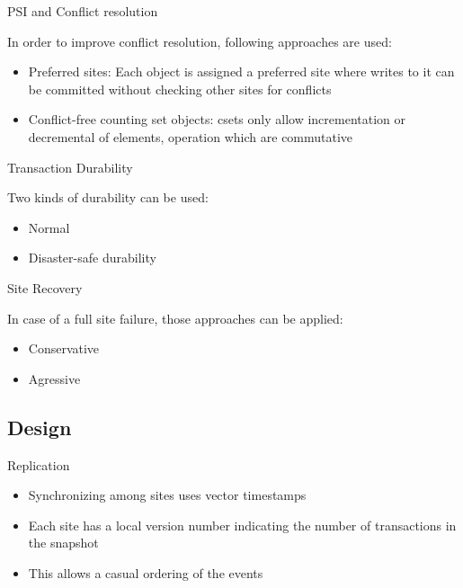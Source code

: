 \documentclass{beamer}
\begin{document}
		\begin{frame}{PSI and Conflict resolution}
		
		In order to improve conflict resolution, following approaches are used:
		
		\begin{itemize}
		
		\item Preferred sites: Each object is assigned a preferred site where writes to it can be committed without checking other sites for conflicts
		\item Conflict-free counting set objects: csets only allow incrementation or decremental of elements, operation which are commutative  
		
		\end{itemize}
		
		\end{frame}
		
		\begin{frame}{Transaction Durability}
		
		Two kinds of durability can be used:

		\begin{itemize}
		\item Normal
		\item Disaster-safe durability
		\end{itemize}		
		
		\end{frame} 	
		
		\begin{frame}{Site Recovery}
		
		In case of a full site failure, those approaches can be applied:
		\begin{itemize}
		\item Conservative
		\item Agressive
		\end{itemize}		
		
		\end{frame}	 	
			 	
	\subsection{Design}
	 	
	 	
		\begin{frame}{Replication}
				
		\begin{itemize}
		
		\item Synchronizing among sites uses vector timestamps
		\item Each site has a local version number indicating the number of transactions in the snapshot
		\item This allows a casual ordering of the events
		
		\end{itemize}
		
		\end{frame}	 	
		
\end{document}
